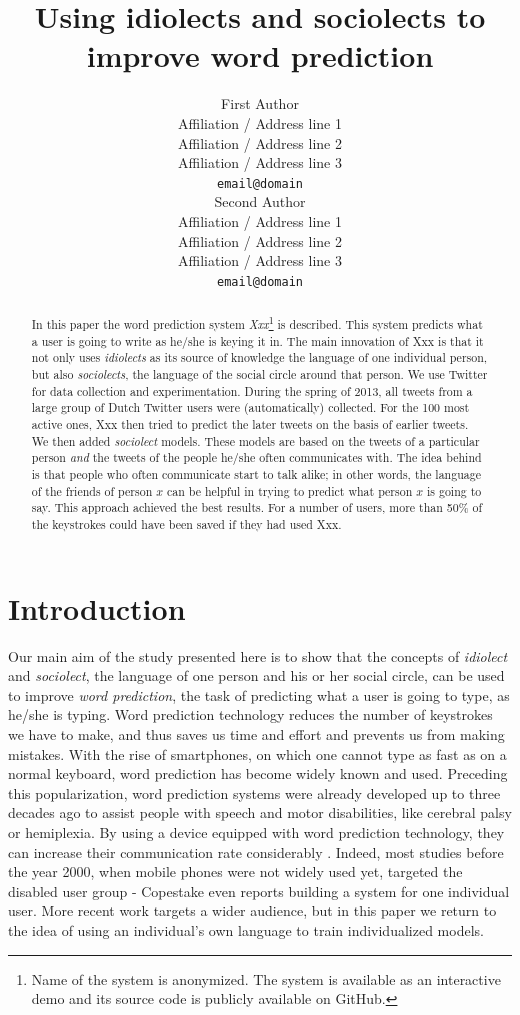 \documentclass[11pt]{article}
\title{Using idiolects and sociolects to improve word prediction}
\author{First Author \\
  Affiliation / Address line 1 \\
  Affiliation / Address line 2 \\
  Affiliation / Address line 3 \\
  {\tt email@domain} \\\And
  Second Author \\
  Affiliation / Address line 1 \\
  Affiliation / Address line 2 \\
  Affiliation / Address line 3 \\
  {\tt email@domain} \\}
\date{}
\begin{document}
\maketitle

\begin{abstract}
In this paper the word prediction system \emph{Xxx}\footnote{Name of the system is anonymized. The system is available as an interactive demo and its source code is publicly available on GitHub.} is described. This system predicts what a user is going to write as he/she is keying it in. The main innovation of Xxx is that it not only uses \emph{idiolects} as its source of knowledge the language of one individual person, but also \emph{sociolects}, the language of the social circle around that person. We use Twitter for data collection and experimentation. During the spring of 2013, all tweets from a large group of Dutch Twitter users were (automatically) collected. For the 100 most active ones, Xxx then tried to predict the later tweets on the basis of earlier tweets. We then added \emph{sociolect} models. These models are based on the tweets of a particular person \emph{and} the tweets of the people he/she often communicates with. The idea behind is that people who often communicate start to talk alike; in other words, the language of the friends of person $x$ can be helpful in trying to predict what person $x$ is going to say. This approach achieved the best results. For a number of users, more than 50\% of the keystrokes could have been saved if they had used Xxx. 
\end{abstract}

\section{Introduction} \label{intro}

Our main aim of the study presented here is to show that the concepts of \emph{idiolect} and \emph{sociolect}, the language of one person and his or her social circle, can be used to improve \emph{word prediction}, the task of predicting what a user is going to type, as he/she is typing. Word prediction technology reduces the number of keystrokes we have to make, and thus saves us time and effort and prevents us from making mistakes. With the rise of smartphones,  on which one  cannot type as fast as on a normal keyboard, word prediction has become widely known and used. Preceding this popularization, word prediction systems were already developed up to three decades ago to assist people with speech and motor disabilities, like cerebral palsy or hemiplexia. By using a device equipped with word prediction technology, they can increase their communication rate considerably \cite{Garay-Vitoria+06}. Indeed, most studies before the year 2000, when mobile phones were not widely used yet, targeted the disabled user group - Copestake  even reports building a system for one individual user. More recent work targets a wider audience, but in this paper we return to the idea of using an individual's own language to train individualized models.
\end{document}
